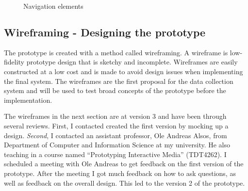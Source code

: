   \begin{figure}[H]
    \centering
    \caption{Navigation elements}
    \label{fig:navigation}
  \end{figure}

  \subsection{Wireframing - Designing the prototype}

    The prototype is created with a method called wireframing. A wireframe is low-fidelity prototype design that is sketchy and incomplete. Wireframes are easily constructed at a low cost and is made to avoid design issues when implementing the final system. The wireframes are the first proposal for the data collection system and will be used to test broad concepts of the prototype before the implementation.

  The wireframes in the next section are at version 3 and have been through several reviews. First, I contacted created the first version by mocking up a design. {\it Second}, I contacted an assistant professor, Ole Andreas Alsos, from Department of Computer and Information Science at my university. He also teaching in a course named ``Prototyping Interactive Media'' (TDT4262). I scheduled a meeting with Ole Andreas to get feedback on the first version of the prototype. After the meeting I got much feedback on how to ask questions, as well as feedback on the overall design. This led to the version 2 of the prototype.

